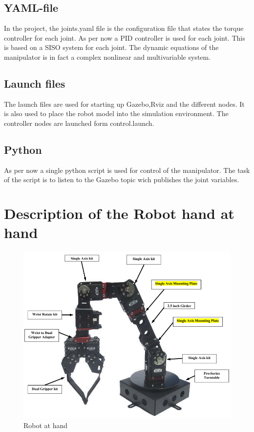 \subsection*{YAML-file}
In the project, the joints.yaml file is the configuration file that states the torque controller for each joint. As per now a PID controller is used for each joint. This is based on a SISO system for each joint. The dynamic equations of the manipulator is in fact a complex nonlinear and multivariable system. 

\subsection*{Launch files}
The launch files are used for starting up Gazebo,Rviz and the different nodes. It is also used to place the robot model into the simulation environment. The controller nodes are launched form control.launch.





\subsection*{Python}
As per now a single python script is used for control of the manipulator. The task of the script is to listen to the Gazebo topic wich publishes the joint variables. 


\section*{Description of the Robot hand at hand}


\begin{figure}[htbp]
  \centering
  \includegraphics[width=.7\textwidth]{img/robotAH.png}
  \caption{Robot at hand}
  \label{fig:robotAH}
\end{figure}



